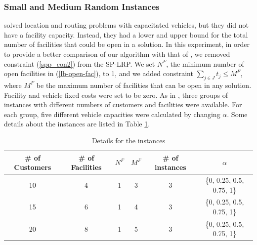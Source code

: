 \subsubsection{Small and Medium Random Instances}
\citet{Laporte86} solved location and routing problems with capacitated
vehicles, but they did not have a facility capacity. Instead, they had
a lower and upper bound for the total number of facilities that could
be open in a solution. In this experiment, in order to provide a
better comparison of our algorithm with that of \citet{Laporte86}, we
removed constraint (\ref{spp_con2}) from the SP-LRP. We set $N^F$, the
minimum number of open facilities in (\ref{lb-open-fac}), to 1, and we
added constraint $\sum_{j \in J} t_{j} \leq M^F$, where $M^F$ be the
maximum number of facilities that can be open in any solution.
Facility and vehicle fixed costs were set to be zero. As in
\citet{Laporte86}, three groups of instances with different numbers of
customers and facilities were available. For each group, five
different vehicle capacities were calculated by changing $\alpha$.
Some details about the instances are listed in Table \ref{inst1}.
\begin {table}[ht]
\begin{center}
\caption {Details for the instances} \label{inst1}
\begin {tabular}[t]{|c|c|c|c|c|c|} \hline
\# of Customers & \# of Facilities & $N^F$ & $M^F$ & \# of instances & $\alpha$ \\ \hline
10 & 4 & 1 & 3 & 3 & \{0, 0.25, 0.5, 0.75, 1\} \\
15 & 6 & 1 & 4 & 3 & \{0, 0.25, 0.5, 0.75, 1\} \\
20 & 8 & 1 & 5 & 3 & \{0, 0.25, 0.5, 0.75, 1\} \\\hline
\end{tabular}
\end{center}
\end{table}

